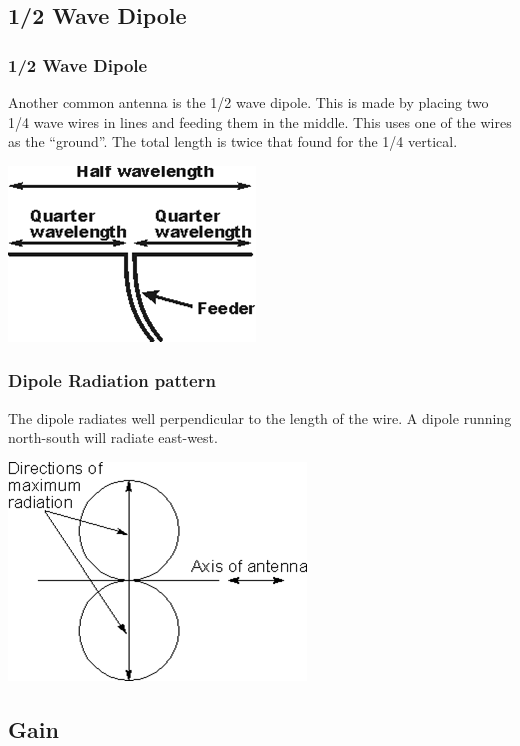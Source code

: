 \documentclass[10pt, handout]{beamer}
\begin{document}
\subsection{1/2 Wave Dipole}

\begin{frame}
\frametitle{1/2 Wave Dipole}
Another common antenna is the 1/2 wave dipole. This is made by placing two 1/4 wave wires in lines and feeding them in the middle. This uses one of the wires as the ``ground''. The total length is twice that found for the 1/4 vertical.
\begin{center}
\includegraphics[height=.5\textheight]{hwavedipole.png}
\end{center}
\end{frame}

\begin{frame}
\frametitle{Dipole Radiation pattern}
The dipole radiates well perpendicular to the length of the wire. A dipole running north-south will radiate east-west.
\begin{center}
\includegraphics[height=.5\textheight]{hwavedipolerad.png}
\end{center}
\end{frame}

\subsection{Gain}
\end{document}
